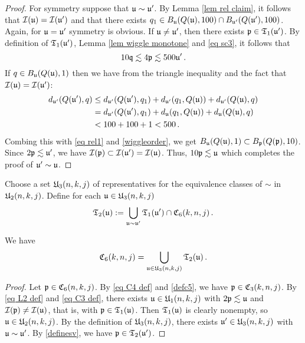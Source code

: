 \begin{proof}
    For symmetry suppose that $\mathfrak u \sim \mathfrak u'$. By Lemma \eqref{lem rel claim}, it follows that $\mathcal{I}(\mathfrak u) = \mathcal{I}(\mathfrak u')$ and that there exists $q_1 \in B_{\mathfrak u}(Q(\mathfrak u), 100) \cap B_{\mathfrak u'}(Q(\mathfrak u'), 100)$. Again, for $\mathfrak u = \mathfrak u'$ symmetry is obvious. If $\mathfrak u \ne \mathfrak u'$, then there exists $\mathfrak p \in \mathfrak{T}_1(\mathfrak u')$. By definition of $\mathfrak{T}_1(\mathfrak u')$, Lemma \ref{lem wiggle monotone} and \eqref{eq sc3}, it follows that
    \begin{equation}
        \label{eq rel1}
        10 \mathfrak q \lesssim 4\mathfrak p \lesssim 500 \mathfrak u'\,.
    \end{equation}
    If $q \in B_{\mathfrak u}(Q(\mathfrak u),1)$ then we have from the triangle inequality and the fact that $\mathcal{I}(\mathfrak u) = \mathcal{I}(\mathfrak u')$:
    \begin{align*}
        d_{\mathfrak u'}(Q(\mathfrak u'), q) &\le d_{\mathfrak u'}(Q(\mathfrak u'), q_1) + d_{\mathfrak u'}(q_1, Q(\mathfrak u)) + d_{\mathfrak u'}(Q(\mathfrak u), q)\\
        &= d_{\mathfrak u'}(Q(\mathfrak u'), q_1) + d_{\mathfrak u}(q_1, Q(\mathfrak u)) + d_{\mathfrak u}(Q(\mathfrak u), q)\\
        &< 100 + 100 + 1 < 500\,.
    \end{align*}
    Combing this with \eqref{eq rel1} and \eqref{wiggleorder}, we get $B_{\mathfrak u}(Q(\mathfrak u), 1) \subset B_{\mathfrak p}(Q(\mathfrak p), 10)$. Since $2\mathfrak p \lesssim \mathfrak u'$, we have $\mathcal{I}(\mathfrak p) \subset \mathcal{I}(\mathfrak u') = \mathcal{I}(\mathfrak u)$. Thus, $10\mathfrak p \lesssim \mathfrak u$ which completes the proof of $\mathfrak u' \sim \mathfrak u$.
\end{proof}

Choose a set  $\mathfrak U_3(n,k,j)$ of representatives for the equivalence
classes of $\sim$ in $\mathfrak U_2(n,k,j)$.
Define for each $\mathfrak u\in \mathfrak U_3(n,k,j)$
\begin{equation}\label{definesv}
\mathfrak T_2(\mathfrak u):=
    \bigcup_{\mathfrak u\sim \mathfrak u'}\mathfrak{T}_1(\mathfrak u')\cap \mathfrak C_6(k,n,j)\, .
\end{equation}

\begin{lemma}
\label{eq forest union}
We have
\begin{equation}
    \mathfrak C_6(k,n,j)=\bigcup_{\mathfrak u\in \mathfrak U_3(n,k,j)}\mathfrak{T}_2(\mathfrak u)\, .
\end{equation}
\end{lemma}
\begin{proof}
    Let $\mathfrak p \in \mathfrak C_6(n,k,j)$.
    By \eqref{eq C4 def} and \eqref{defc5}, we have $\mathfrak p \in \mathfrak C_3(k,n,j)$. By \eqref{eq L2 def} and \eqref{eq C3 def}, there exists $\mathfrak u \in \mathfrak U_1(n,k,j)$ with $2\mathfrak p \lesssim \mathfrak u$ and $\mathcal{I}(\mathfrak p) \ne \mathcal{I}(\mathfrak u)$, that is, with $\mathfrak p \in \mathfrak{T}_1(\mathfrak u)$. Then $\mathfrak{T}_1(\mathfrak u)$ is clearly nonempty, so $\mathfrak u \in \mathfrak U_2(n,k,j)$. By the definition of $\mathfrak U_3(n,k,j)$, there exists $\mathfrak u' \in \mathfrak U_3(n,k,j)$ with $\mathfrak u \sim \mathfrak u'$. By \eqref{definesv}, we have $\mathfrak p \in \mathfrak{T}_2(\mathfrak u')$.
\end{proof}

